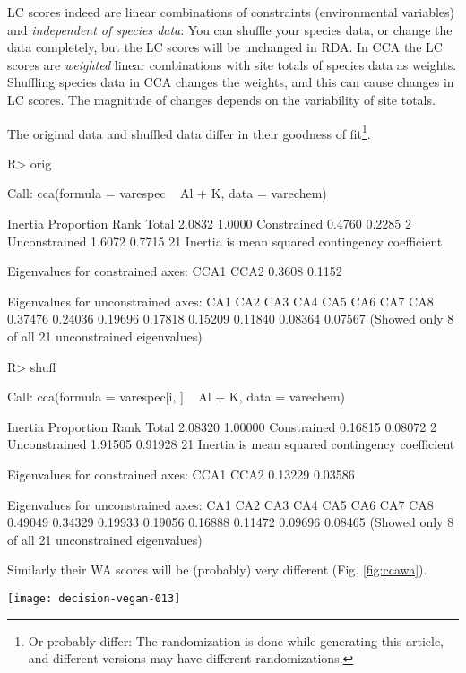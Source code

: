 \documentclass[article,nojss]{jss}
\begin{document}
LC scores indeed are linear combinations of constraints (environmental
variables) and \emph{independent of species data}: You can
shuffle your species data, or change the data completely, but the LC
scores will be unchanged in RDA.  In CCA the LC scores are
\emph{weighted} linear combinations with site totals of species data
as weights. Shuffling species data in CCA changes the weights, and
this can cause changes in LC scores.  The magnitude of changes depends
on the variability of site totals.

The original data and shuffled data differ in their goodness of
fit\footnote{Or probably differ: The randomization is done while
generating this article, and different versions may have different
randomizations.}.
\begin{Schunk}
\begin{Sinput}
R> orig
\end{Sinput}
\begin{Soutput}
Call: cca(formula = varespec ~ Al + K, data = varechem)

              Inertia Proportion Rank
Total          2.0832     1.0000     
Constrained    0.4760     0.2285    2
Unconstrained  1.6072     0.7715   21
Inertia is mean squared contingency coefficient 

Eigenvalues for constrained axes:
  CCA1   CCA2 
0.3608 0.1152 

Eigenvalues for unconstrained axes:
    CA1     CA2     CA3     CA4     CA5     CA6     CA7     CA8 
0.37476 0.24036 0.19696 0.17818 0.15209 0.11840 0.08364 0.07567 
(Showed only 8 of all 21 unconstrained eigenvalues)
\end{Soutput}
\begin{Sinput}
R> shuff
\end{Sinput}
\begin{Soutput}
Call: cca(formula = varespec[i, ] ~ Al + K, data = varechem)

              Inertia Proportion Rank
Total         2.08320    1.00000     
Constrained   0.16815    0.08072    2
Unconstrained 1.91505    0.91928   21
Inertia is mean squared contingency coefficient 

Eigenvalues for constrained axes:
   CCA1    CCA2 
0.13229 0.03586 

Eigenvalues for unconstrained axes:
    CA1     CA2     CA3     CA4     CA5     CA6     CA7     CA8 
0.49049 0.34329 0.19933 0.19056 0.16888 0.11472 0.09696 0.08465 
(Showed only 8 of all 21 unconstrained eigenvalues)
\end{Soutput}
\end{Schunk}
Similarly their WA scores will be (probably) very different
(Fig. \ref{fig:ccawa}).
\begin{SCfigure}
\texttt{[image: decision-vegan-013]}
\caption{Procrustes rotation of WA scores of CCA with the original and
  shuffled data.}
\label{fig:ccawa}
\end{SCfigure}
\end{document}

